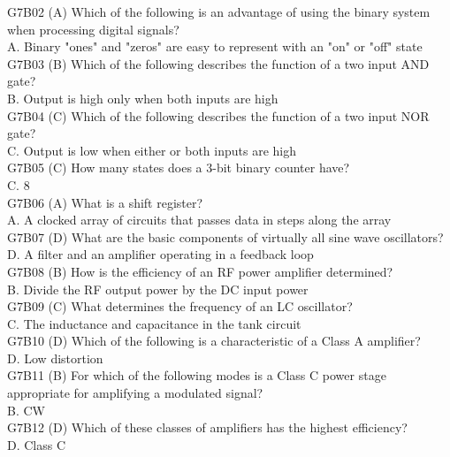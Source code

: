 \documentclass[12pt,letterpaper]{report}
\begin{document}
G7B02 (A) Which of the following is an advantage of using the binary system when processing digital signals?\\
A. Binary "ones" and "zeros" are easy to represent with an "on" or "off" state\\

G7B03 (B) Which of the following describes the function of a two input AND gate?\\
B. Output is high only when both inputs are high\\

G7B04 (C)  Which of the following describes the function of a two input NOR gate?\\
C. Output is low when either or both inputs are high\\

G7B05 (C) How many states does a 3-bit binary counter have?\\
C. 8\\

G7B06 (A) What is a shift register?\\
A. A clocked array of circuits that passes data in steps along the array\\

G7B07 (D) What are the basic components of virtually all sine wave oscillators?\\
D. A filter and an amplifier operating in a feedback loop \\

G7B08 (B) How is the efficiency of an RF power amplifier determined?\\
B. Divide the RF output power by the DC input power\\

G7B09 (C) What determines the frequency of an LC oscillator?\\
C. The inductance and capacitance in the tank circuit\\

G7B10 (D) Which of the following is a characteristic of a Class A amplifier?\\
D. Low distortion\\

G7B11 (B) For which of the following modes is a Class C power stage appropriate for amplifying a modulated signal?\\
B. CW\\

G7B12 (D) Which of these classes of amplifiers has the highest efficiency?\\
D. Class C\\
\end{document}
